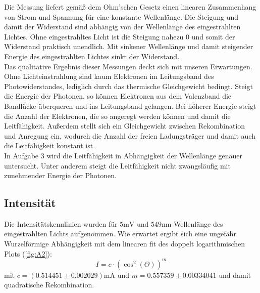 Die Messung liefert gemäß dem Ohm'schen Gesetz einen linearen Zusammenhang von Strom und Spannung für eine konstante Wellenlänge. Die Steigung und damit der Widerstand sind abhängig von der Wellenlänge des eingestrahlten Lichtes. Ohne eingestrahltes Licht ist die Steigung nahezu 0 und somit der Widerstand praktisch unendlich. Mit sinkener Wellenlänge und damit steigender Energie des eingestrahlten Lichtes sinkt der Widerstand. \\
Das qualitative Ergebnis dieser Messungen deckt sich mit unseren Erwartungen. Ohne Lichteinstrahlung sind kaum Elektronen im Leitungsband des Photowiderstandes, lediglich durch das thermische Gleichgewicht bedingt. Steigt die Energie der Photonen, so können Elektronen aus dem Valenzband die Bandlücke überqueren und ins Leitungsband gelangen. Bei höherer Energie steigt die Anzahl der Elektronen, die so angeregt werden können und damit die Leitfähigkeit. Außerdem stellt sich ein Gleichgewicht zwischen Rekombination und Anregung ein, wodurch die Anzahl der freien Ladungsträger und damit auch die Leitfähigkeit konstant ist. \\
In Aufgabe 3 wird die Leitfähigkeit in Abhängigkeit der Wellenlänge genauer untersucht. Unter anderem steigt die Leitfähigkeit nicht zwangsläufig mit zunehmender Energie der Photonen. \\

\FloatBarrier

\subsection{Intensität}

Die Intensitätskennlinien wurden für $5 \text{mV}$ und $ 549 \text{nm}$ Wellenlänge des eingestrahlten Lichts  aufgenommen. 
Wie erwartet ergibt sich eine ungefähr Wurzelförmige Abhängigkeit mit dem linearen fit des doppelt logarithmischen Plots (\ref{fig:A2}):
$$I = c \cdot (\cos^2(\Theta) )^{m}$$
mit $c = (0.514451 \pm 0.002029) \text{mA} $ und $m = 0.557359 \pm 0.00334041$
und damit quadratische Rekombination.


